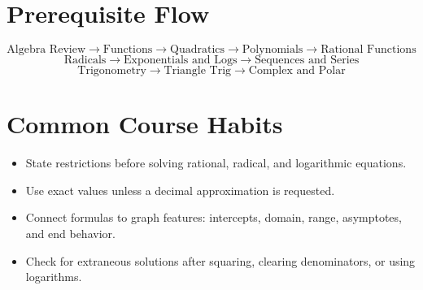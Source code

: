 \documentclass[11pt]{article}
\begin{document}
\section*{Prerequisite Flow}
\[
\text{Algebra Review}\rightarrow \text{Functions}\rightarrow \text{Quadratics}\rightarrow \text{Polynomials}\rightarrow \text{Rational Functions}
\]
\[
\text{Radicals}\rightarrow \text{Exponentials and Logs}\rightarrow \text{Sequences and Series}
\]
\[
\text{Trigonometry}\rightarrow \text{Triangle Trig}\rightarrow \text{Complex and Polar}
\]

\section*{Common Course Habits}
\begin{itemize}
  \item State restrictions before solving rational, radical, and logarithmic equations.
  \item Use exact values unless a decimal approximation is requested.
  \item Connect formulas to graph features: intercepts, domain, range, asymptotes, and end behavior.
  \item Check for extraneous solutions after squaring, clearing denominators, or using logarithms.
\end{itemize}
\end{document}
